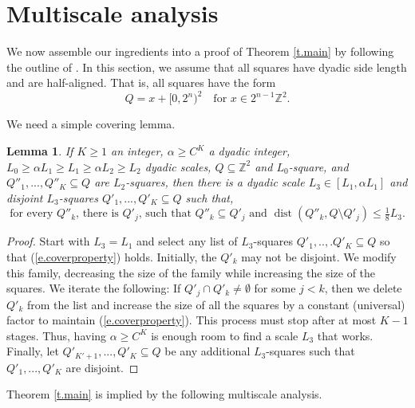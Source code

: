 \documentclass{amsart}
\newtheorem{lemma}[equation]{Lemma}
\newcommand{\eref}[1]{(\ref{e.#1})}
\newcommand{\tref}[1]{Theorem \ref{t.#1}}
\numberwithin{equation}{section}
\numberwithin{figure}{section}
\newcommand{\Z}{\mathbb{Z}}
\newcommand{\dist}{\operatorname{dist}}
\begin{document}
\section{Multiscale analysis}

We now assemble our ingredients into a proof of \tref{main} by following the outline of \cite{Bourgain-Kenig}.  In this section, we assume that all squares have dyadic side length and are half-aligned.  That is, all squares have the form
\begin{equation*}
Q = x + [0,2^n)^2 \quad \mbox{for } x \in 2^{n-1} \Z^2.
\end{equation*}

We need a simple covering lemma.

\begin{lemma}
\label{l.cover}
If $K \geq 1$ an integer, $\alpha \geq C^K$ a dyadic integer, $L_0 \geq \alpha L_1 \geq L_1 \geq \alpha L_2 \geq L_2$ dyadic scales, $Q \subseteq \Z^2$ and $L_0$-square, and $Q''_1, ..., Q''_K \subseteq Q$ are $L_2$-squares, then there is a dyadic scale $L_3 \in [L_1,\alpha L_1]$ and disjoint $L_3$-squares $Q'_1, ..., Q'_K \subseteq Q$ such that,
\begin{equation}
\label{e.coverproperty}
\mbox{for every $Q''_k$, there is $Q'_j$, such that $Q''_k \subseteq Q'_j$ and $\dist(Q''_k,Q \setminus Q'_j) \leq \tfrac18 L_3$}.
\end{equation}
\end{lemma}

\begin{proof}
Start with $L_3 = L_1$ and select any list of $L_3$-squares $Q'_1, ..,. Q'_K \subseteq Q$ so that \eref{coverproperty} holds.  Initially, the $Q'_k$ may not be disjoint.  We modify this family, decreasing the size of the family while increasing the size of the squares.  We iterate the following: If $Q'_j \cap Q'_k \neq \emptyset$ for some $j < k$, then we delete $Q'_k$ from the list and increase the size of all the squares by a constant (universal) factor to maintain \eref{coverproperty}.  This process must stop after at most $K-1$ stages.  Thus, having $\alpha \geq C^K$ is enough room to find a scale $L_3$ that works. Finally, let $Q'_{K'+1}, ..., Q'_K \subseteq Q$ be any additional $L_3$-squares such that $Q'_1, ..., Q'_K$ are disjoint.
\end{proof}

\tref{main} is implied by the following multiscale analysis.
\end{document}
